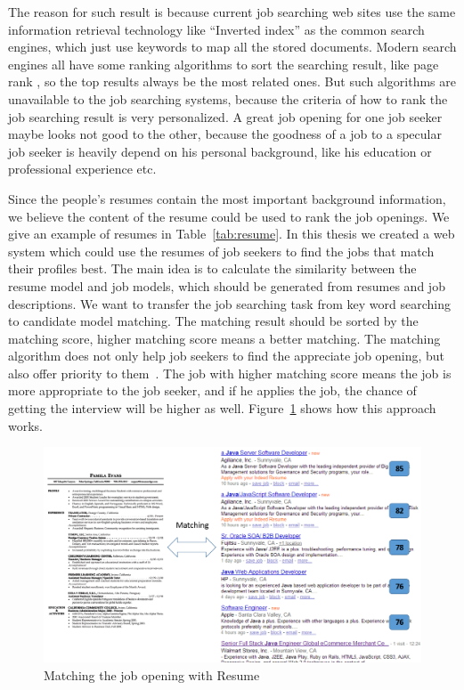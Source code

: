 The reason for such result is because current job searching web sites use the same information retrieval technology like ``Inverted index'' \cite{zobel2006inverted} as the common search engines, which just use keywords to map all the stored documents. Modern search engines all have some ranking algorithms to sort the searching result, like page rank \cite{page1999pagerank}, so the top results always be the most related ones. But such algorithms are unavailable to the job searching systems, because the criteria  of how to rank the job searching result is very personalized. A great job opening for one job seeker maybe looks not good to the other, because the goodness of a job to a specular job seeker is heavily depend on his personal background, like his education or professional experience etc.

Since the people's resumes contain the most important background information, we believe the content of the resume could be used to rank the job openings. We give an example of resumes in Table~\ref{tab:resume}. In this thesis we created a web system which could use the resumes of job seekers to find the jobs that match their profiles best. The main idea is to calculate the similarity between the resume model and job models, which should be generated from resumes and job descriptions. We want to transfer the job searching task from key word searching to candidate model matching. The matching result should be sorted by the matching score, higher matching score means a better matching. The matching algorithm does not only help job seekers to find the appreciate job opening, but also offer priority to them~\cite{gueutal2006brave}.  The job with higher matching score means the job is more appropriate to the job seeker, and if he applies the job, the chance of getting the interview will be higher as well. Figure~\ref{fig:Matching} shows how this approach works.


\begin{figure}[htbp]
  \centering
  \includegraphics[scale=0.5]{images/matching.png}
  \caption{Matching the job opening with Resume}
  \label{fig:Matching}
\end{figure}


